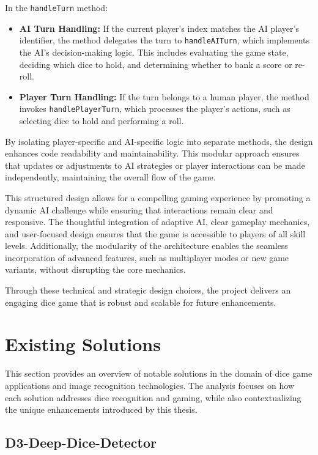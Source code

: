 In the \texttt{handleTurn} method:
\begin{itemize}
    \item \textbf{AI Turn Handling:} If the current player's index matches the AI player's identifier, the method delegates the turn to \texttt{handleAITurn}, which implements the AI's decision-making logic. This includes evaluating the game state, deciding which dice to hold, and determining whether to bank a score or re-roll.
    \item \textbf{Player Turn Handling:} If the turn belongs to a human player, the method invokes \texttt{handlePlayerTurn}, which processes the player's actions, such as selecting dice to hold and performing a roll.
\end{itemize}

By isolating player-specific and AI-specific logic into separate methods, the design enhances code readability and maintainability. This modular approach ensures that updates or adjustments to AI strategies or player interactions can be made independently, maintaining the overall flow of the game.

This structured design allows for a compelling gaming experience by promoting a dynamic AI challenge while ensuring that interactions remain clear and responsive. The thoughtful integration of adaptive AI, clear gameplay mechanics, and user-focused design ensures that the game is accessible to players of all skill levels. Additionally, the modularity of the architecture enables the seamless incorporation of advanced features, such as multiplayer modes or new game variants, without disrupting the core mechanics.

Through these technical and strategic design choices, the project delivers an engaging dice game that is robust and scalable for future enhancements.


\section{Existing Solutions}

This section provides an overview of notable solutions in the domain of dice game applications and image recognition technologies. The analysis focuses on how each solution addresses dice recognition and gaming, while also contextualizing the unique enhancements introduced by this thesis.

\subsection{D3-Deep-Dice-Detector}

